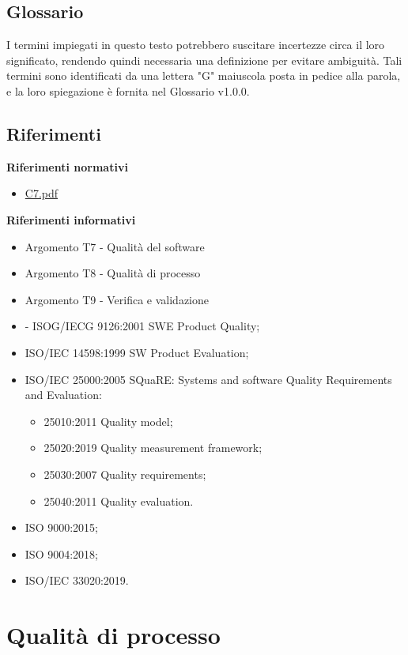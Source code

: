 \documentclass{article}
\begin{document}
\subsection{Glossario}
I termini impiegati in questo testo potrebbero suscitare incertezze circa il loro significato, rendendo quindi necessaria una definizione per evitare ambiguità. Tali termini sono identificati da una lettera "G" maiuscola posta in pedice alla parola, e la loro spiegazione è fornita nel Glossario v1.0.0.

\subsection{Riferimenti}
\textbf{Riferimenti normativi}
\begin{itemize}
    \item \href{https://www.math.unipd.it/~tullio/IS-1/2023/Progetto/C7.pdf}{C7.pdf}
\end{itemize}
\textbf{Riferimenti informativi}
\begin{itemize}
    \item Argomento T7 - Qualità del software
    \item Argomento T8 - Qualità di processo
    \item Argomento T9 - Verifica e validazione
    \item - ISOG/IECG 9126:2001 SWE Product Quality;
    \item ISO/IEC 14598:1999 SW Product Evaluation;
    \item  ISO/IEC 25000:2005 SQuaRE: Systems and software Quality Requirements and Evaluation:
        \begin{itemize}
        \item 25010:2011 Quality model;
        \item 25020:2019 Quality measurement framework;
        \item 25030:2007 Quality requirements;
        \item 25040:2011 Quality evaluation.
    \end{itemize}
    \item ISO 9000:2015;
    \item ISO 9004:2018;
    \item ISO/IEC 33020:2019.
\end{itemize}

\section{Qualità di processo}
\end{document}
